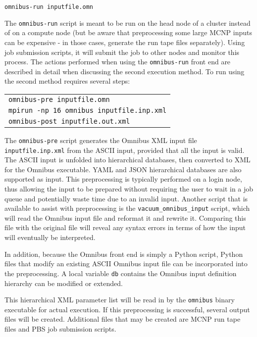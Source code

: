 \documentclass[10pt]{article}
\begin{document}
\texttt{omnibus-run inputfile.omn}\newline

The \texttt{omnibus-run} script is meant to be run on the head node of a cluster instead of on a compute node (but be aware that preprocessing some large MCNP inputs can be expensive - in those cases, generate the run tape files separately). Using job submission scripts, it will submit the job to other nodes and monitor this process. The actions performed when using the \texttt{omnibus-run} front end are described in detail when discussing the second execution method. To run using the second method requires several steps:\newline

\begin{tabular}{l}
\texttt{omnibus-pre inputfile.omn}\\
\texttt{mpirun -np 16 omnibus inputfile.inp.xml}\\
\texttt{omnibus-post inputfile.out.xml}\\
\end{tabular}\newline

The \texttt{omnibus-pre} script generates the Omnibus XML input file \texttt{inputfile.inp.xml} from the ASCII input, provided that all the input is valid. The ASCII input is unfolded into hierarchical databases, then converted to XML for the Omnibus executable. YAML and JSON hierarchical databases are also supported as input. This preprocessing is typically performed on a login node, thus allowing the input to be prepared without requiring the user to wait in a job queue and potentially waste time due to an invalid input. Another script that is available to assist with preprocessing is the \texttt{vacuum\_omnibus\_input} script, which will read the Omnibus input file and reformat it and rewrite it. Comparing this file with the original file will reveal any syntax errors in terms of how the input will eventually be interpreted.

In addition, because the Omnibus front end is simply a Python script, Python files that modify an existing ASCII Omnibus input file can be incorporated into the preprocessing. A local variable \texttt{db} contains the Omnibus input definition hierarchy can be modified or extended. 

This hierarchical XML parameter list will be read in by the \texttt{omnibus} binary executable for actual execution. If this preprocessing is successful, several output files will be created. Additional files that may be created are MCNP run tape files and PBS job submission scripts.\newline
\end{document}
